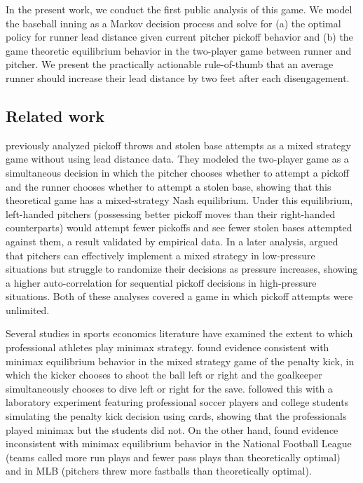 \documentclass{article}
\begin{document}
    In the present work, we conduct the first public analysis of this game. We model the baseball inning as a Markov decision process and solve for (a) the optimal policy for runner lead distance given current pitcher pickoff behavior and (b) the game theoretic equilibrium behavior in the two-player game between runner and pitcher. We present the practically actionable rule-of-thumb that an average runner should increase their lead distance by two feet after each disengagement.

    \subsection{Related work}

    \cite{downey_pick_2015} previously analyzed pickoff throws and stolen base attempts as a mixed strategy game without using lead distance data. They modeled the two-player game as a simultaneous decision in which the pitcher chooses whether to attempt a pickoff and the runner chooses whether to attempt a stolen base, showing that this theoretical game has a mixed-strategy Nash equilibrium. Under this equilibrium, left-handed pitchers (possessing better pickoff moves than their right-handed counterparts) would attempt fewer pickoffs and see fewer stolen bases attempted against them, a result validated by empirical data. In a later analysis, \cite{downey_pressure_2019} argued that pitchers can effectively implement a mixed strategy in low-pressure situations but struggle to randomize their decisions as pressure increases, showing a higher auto-correlation for sequential pickoff decisions in high-pressure situations. Both of these analyses covered a game in which pickoff attempts were unlimited.

    Several studies in sports economics literature have examined the extent to which professional athletes play minimax strategy. \cite{palacios-huerta_professionals_2003} found evidence consistent with minimax equilibrium behavior in the mixed strategy game of the penalty kick, in which the kicker chooses to shoot the ball left or right and the goalkeeper simultaneously chooses to dive left or right for the save. \cite{palacios-huerta_experientia_2008} followed this with a laboratory experiment featuring professional soccer players and college students simulating the penalty kick decision using cards, showing that the professionals played minimax but the students did not. On the other hand, \cite{kovash_professionals_2009} found evidence inconsistent with minimax equilibrium behavior in the National Football League (teams called more run plays and fewer pass plays than theoretically optimal) and in MLB (pitchers threw more fastballs than theoretically optimal).
\end{document}
